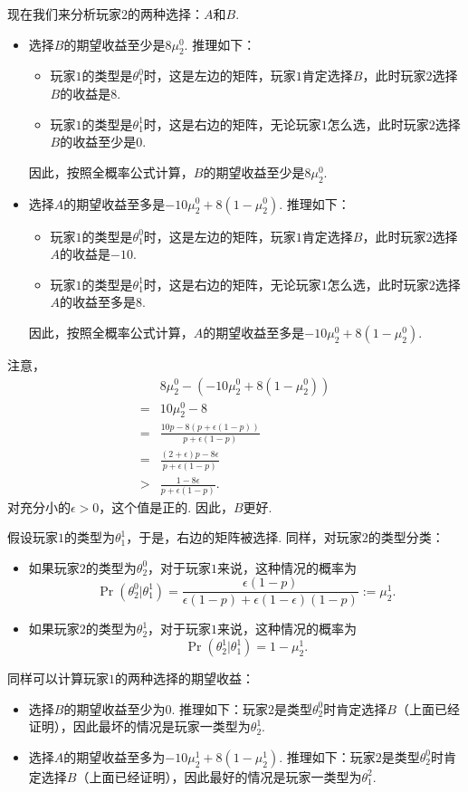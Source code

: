 现在我们来分析玩家$2$的两种选择：$A$和$B$.
\begin{itemize}
    \item 选择$B$的期望收益至少是$8\mu_2^0$. 推理如下：
    \begin{itemize}
        \item 玩家$1$的类型是$\theta_1^0$时，这是左边的矩阵，玩家$1$肯定选择$B$，此时玩家$2$选择$B$的收益是$8$.
        \item 玩家$1$的类型是$\theta_1^1$时，这是右边的矩阵，无论玩家$1$怎么选，此时玩家$2$选择$B$的收益至少是$0$.
    \end{itemize}
    因此，按照全概率公式计算，$B$的期望收益至少是$8\mu_2^0$.
    \item 选择$A$的期望收益至多是$-10\mu_2^0 + 8(1 - \mu_2^0)$. 推理如下：
    \begin{itemize}
        \item 玩家$1$的类型是$\theta_1^0$时，这是左边的矩阵，玩家$1$肯定选择$B$，此时玩家$2$选择$A$的收益是$-10$.
        \item 玩家$1$的类型是$\theta_1^1$时，这是右边的矩阵，无论玩家$1$怎么选，此时玩家$2$选择$A$的收益至多是$8$.
    \end{itemize}
    因此，按照全概率公式计算，$A$的期望收益至多是$-10\mu_2^0 + 8(1 - \mu_2^0)$.
\end{itemize}

注意，
\begin{align*}
    &8\mu_2^0-(-10\mu_2^0 + 8(1 - \mu_2^0))\\
    =& 10\mu_2^0 - 8\\
    =& \frac{10p-8(p+\epsilon(1-p))}{p+\epsilon(1-p)}\\
    =& \frac{(2+\epsilon)p-8\epsilon}{p+\epsilon(1-p)}\\
    >& \frac{1-8\epsilon}{p+\epsilon(1-p)}.
\end{align*}
对充分小的$\epsilon>0$，这个值是正的. 因此，$B$更好.

假设玩家$1$的类型为$\theta_1^1$，于是，右边的矩阵被选择. 同样，对玩家$2$的类型分类：
\begin{itemize}
    \item 如果玩家$2$的类型为$\theta_2^0$，对于玩家$1$来说，这种情况的概率为
    \[\Pr(\theta_2^0|\theta_1^1) = \frac{\epsilon(1-p)}{\epsilon(1-p)+\epsilon(1-\epsilon)(1-p)} := \mu_2^1.\]
    \item 如果玩家$2$的类型为$\theta_2^1$，对于玩家$1$来说，这种情况的概率为
    \[\Pr(\theta_2^1|\theta_1^1) = 1 - \mu_2^1.\]
\end{itemize}
同样可以计算玩家$1$的两种选择的期望收益：
\begin{itemize}
    \item 选择$B$的期望收益至少为$0$. 推理如下：玩家$2$是类型$\theta_2^0$时肯定选择$B$（上面已经证明），因此最坏的情况是玩家一类型为$\theta_2^1$. 
    \item 选择$A$的期望收益至多为$-10\mu_2^1 + 8(1 - \mu_2^1)$. 推理如下：玩家$2$是类型$\theta_2^0$时肯定选择$B$（上面已经证明），因此最好的情况是玩家一类型为$\theta_1^2$.
\end{itemize}

